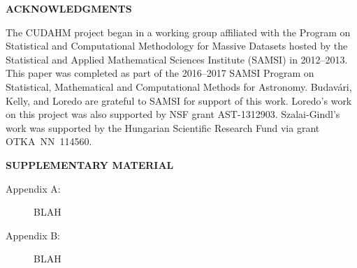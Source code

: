 \documentclass[12pt]{article}
\numberwithin{equation}{section}
\numberwithin{figure}{section}
\numberwithin{table}{section}
\begin{document}

%





\begin{center}
{\large\bf ACKNOWLEDGMENTS}
\end{center}

The CUDAHM project began in a working group affiliated with the Program on Statistical and Computational Methodology for Massive Datasets hosted by the Statistical and Applied Mathematical Sciences Institute (SAMSI) in 2012--2013.
This paper was completed as part of the 2016--2017 SAMSI Program on Statistical, Mathematical and Computational Methods for Astronomy.
Budav\'ari, Kelly, and Loredo are grateful to SAMSI for support of this work.
Loredo's work on this project was also supported by NSF grant AST-1312903.
Szalai-Gindl's work was supported by the Hungarian Scientific Research Fund via grant OTKA~NN~114560.


\begin{center}
{\large\bf SUPPLEMENTARY MATERIAL}
\end{center}

\begin{description}

\item[Appendix A:] BLAH

\item[Appendix B:] BLAH

\end{description}





\end{document}
